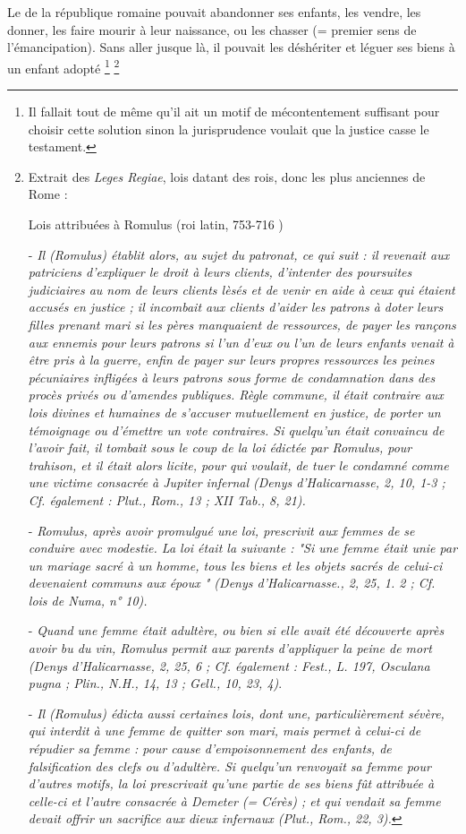 Le  de la république romaine pouvait abandonner ses
enfants, les vendre, les donner, les faire mourir à leur naissance, ou les
chasser (= premier sens de l'émancipation). Sans aller jusque là, il pouvait
les déshériter et léguer ses biens à un enfant adopté%
\footnote{Il fallait tout de même qu'il ait un motif de mécontentement suffisant pour choisir cette solution sinon
la jurisprudence voulait que la justice casse le testament.}
\footnote{Extrait des \emph{Leges Regiae}, lois datant des rois, donc les plus anciennes de Rome :


Lois attribuées à Romulus (roi latin, 753-716 )

- \emph{Il (Romulus) établit alors, au sujet du patronat, ce qui suit : il revenait aux patriciens d'expliquer le droit à leurs clients, d'intenter des poursuites judiciaires au nom de leurs clients lèsés et de venir en aide à ceux qui étaient accusés en justice ; il incombait aux clients d'aider les patrons à doter leurs filles prenant mari si les pères manquaient de ressources, de payer les rançons aux ennemis pour leurs patrons si l'un d'eux ou l'un de leurs enfants venait à être pris à la guerre, enfin de payer sur leurs propres ressources les peines pécuniaires infligées à leurs patrons sous forme de condamnation dans des procès privés ou d'amendes publiques. Règle commune, il était contraire aux lois divines et humaines de s'accuser mutuellement en justice, de porter un témoignage ou d'émettre un vote contraires. Si quelqu'un était convaincu de l'avoir fait, il tombait sous le coup de la loi édictée par Romulus, pour trahison, et il était alors licite, pour qui voulait, de tuer le condamné comme une victime consacrée à Jupiter infernal (Denys d'Halicarnasse, 2, 10, 1-3 ; Cf. également : Plut., Rom., 13 ; XII Tab., 8, 21).}

-\emph{ Romulus, après avoir promulgué une loi, prescrivit aux femmes de se conduire avec modestie. La loi était la suivante : "\emph{Si une femme était unie par un mariage sacré à un homme, tous les biens et les objets sacrés de celui-ci devenaient communs aux époux} " (Denys d'Halicarnasse., 2, 25, 1. 2 ; Cf. lois de Numa, n° 10).}

- \emph{Quand une femme était adultère, ou bien si elle avait été découverte après avoir bu du vin, Romulus permit aux parents d'appliquer la peine de mort (Denys d'Halicarnasse, 2, 25, 6 ; Cf. également : Fest., L. 197, Osculana pugna ; Plin., N.H., 14, 13 ; Gell., 10, 23, 4)}.

- \emph{Il (Romulus) édicta aussi certaines lois, dont une, particulièrement sévère, qui interdit à une femme de quitter son mari, mais permet à celui-ci de répudier sa femme : pour cause d'empoisonnement des enfants, de falsification des clefs ou d'adultère. Si quelqu'un renvoyait sa femme pour d'autres motifs, la loi prescrivait qu'une partie de ses biens fût attribuée à celle-ci et l'autre consacrée à Demeter (= Cérès) ; et qui vendait sa femme devait offrir un sacrifice aux dieux infernaux (Plut., Rom., 22, 3).}

}
